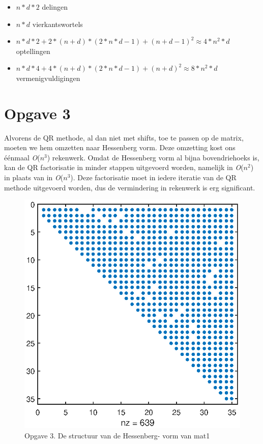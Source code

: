 \documentclass[]{article}
\newcommand{\opgave}[1]{\pagebreak\section*{Opgave #1}}
\begin{document}
\begin{itemize}
  \item $n*d*2$ delingen
  \item $n*d$ vierkantswortels
  \item $n*d*2 + 2*(n+d)*(2*n*d-1) + (n+d-1)^2 \approx 4*n^2*d$ optellingen
  \item $n*d*4 + 4*(n+d)*(2*n*d-1) + (n+d)^2 \approx 8*n^2*d$ vermenigvuldigingen
\end{itemize}


\opgave{3}
Alvorens de QR methode, al dan niet met shifts, toe te passen op de matrix, moeten we hem omzetten naar Hessenberg vorm. Deze omzetting kost ons \'{e}\'{e}nmaal \textit{O}($n^3$) rekenwerk. \linebreak
Omdat de Hessenberg vorm al bijna bovendriehoeks is, kan de QR factorisatie in minder stappen uitgevoerd worden, namelijk in \textit{O}($n^2$) in plaats van in \textit{O}($n^3$). Deze factorisatie moet in iedere iteratie van de QR methode uitgevoerd worden, dus  de vermindering in rekenwerk is erg significant. 

\begin{figure}
\begin{center}
\includegraphics[width=1\textwidth]{opgave3.eps}
\end{center}
\caption{Opgave 3. De structuur van de Hessenberg- vorm van mat1}
\end{figure}
\end{document}
